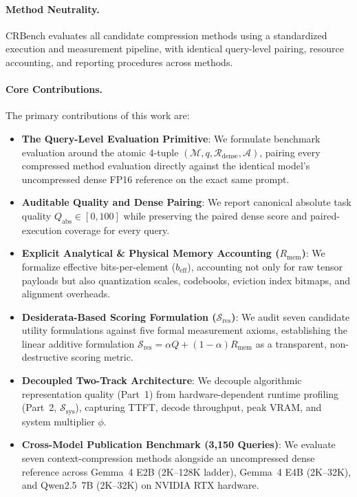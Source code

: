 \documentclass[10pt]{article}
\theoremstyle{definition}
\begin{document}
\paragraph{Method Neutrality.} CRBench evaluates all candidate compression methods using a standardized execution and measurement pipeline, with identical query-level pairing, resource accounting, and reporting procedures across methods.

\paragraph{Core Contributions.} The primary contributions of this work are:
\begin{itemize}[leftmargin=*,itemsep=1.5pt]
    \item \textbf{The Query-Level Evaluation Primitive}: We formulate benchmark evaluation around the atomic 4-tuple $(\mathcal{M}, q, \mathcal{R}_{\text{dense}}, \mathcal{A})$, pairing every compressed method evaluation directly against the identical model's uncompressed dense FP16 reference on the exact same prompt.
    \item \textbf{Auditable Quality and Dense Pairing}: We report canonical absolute task quality $Q_{\text{abs}} \in [0,100]$ while preserving the paired dense score and paired-execution coverage for every query.
    \item \textbf{Explicit Analytical \& Physical Memory Accounting ($R_{\text{mem}}$)}: We formalize effective bits-per-element ($b_{\text{eff}}$), accounting not only for raw tensor payloads but also quantization scales, codebooks, eviction index bitmaps, and alignment overheads.
    \item \textbf{Desiderata-Based Scoring Formulation ($\mathcal{S}_{\text{res}}$)}: We audit seven candidate utility formulations against five formal measurement axioms, establishing the linear additive formulation $\mathcal{S}_{\text{res}} = \alpha Q + (1-\alpha) R_{\text{mem}}$ as a transparent, non-destructive scoring metric.
    \item \textbf{Decoupled Two-Track Architecture}: We decouple algorithmic representation quality (Part~1) from hardware-dependent runtime profiling (Part~2, $\mathcal{S}_{\text{sys}}$), capturing TTFT, decode throughput, peak VRAM, and system multiplier $\phi$.
    \item \textbf{Cross-Model Publication Benchmark (3,150 Queries)}: We evaluate seven context-compression methods alongside an uncompressed dense reference across Gemma~4 E2B (2K--128K ladder), Gemma~4 E4B (2K--32K), and Qwen2.5~7B (2K--32K) on NVIDIA RTX hardware.
\end{itemize}
\end{document}

